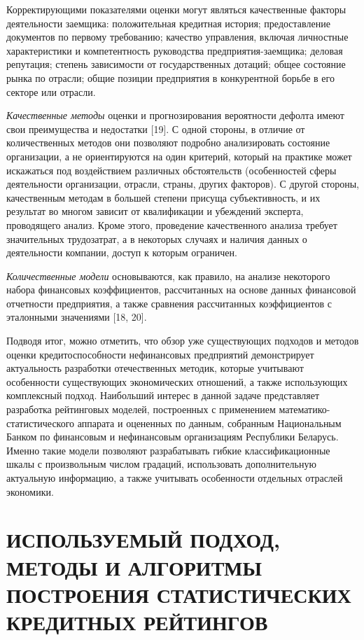 \documentclass[14pt,a4paper]{extarticle}
\begin{document}
Корректирующими показателями оценки могут являться качественные факторы деятельности заемщика: 
положительная кредитная история; предоставление документов по первому требованию; качество управления, 
включая личностные характеристики и компетентность руководства предприятия-заемщика; деловая репутация; 
степень зависимости от государственных дотаций; общее состояние рынка по отрасли; общие позиции 
предприятия в конкурентной борьбе в его секторе или отрасли.

\textit{Качественные методы} оценки и прогнозирования вероятности дефолта имеют свои преимущества и 
недостатки [19]. С одной стороны, в отличие от количественных методов они позволяют подробно 
анализировать состояние организации, а не ориентируются на один критерий, который на практике может 
искажаться под воздействием различных обстоятельств (особенностей сферы деятельности организации, отрасли, 
страны, других факторов). С другой стороны, качественным методам в большей степени присуща субъективность, 
и их результат во многом зависит от квалификации и убеждений эксперта, проводящего анализ. Кроме этого, 
проведение качественного анализа требует значительных трудозатрат, а в некоторых случаях и наличия данных 
о деятельности компании, доступ к которым ограничен.

\textit{Количественные модели} основываются, как правило, на анализе некоторого набора финансовых 
коэффициентов, рассчитанных на основе данных финансовой отчетности предприятия, а также сравнения 
рассчитанных коэффициентов с эталонными значениями [18, 20].

Подводя итог, можно отметить, что обзор уже существующих подходов и методов оценки кредитоспособности 
нефинансовых предприятий демонстрирует актуальность разработки отечественных методик, которые учитывают 
особенности существующих экономических отношений, а также использующих комплексный подход. Наибольший 
интерес в данной задаче представляет разработка рейтинговых моделей, построенных с применением 
математико-статистического аппарата и оцененных по данным, собранным Национальным Банком по финансовым 
и нефинансовым организациям Республики Беларусь. Именно такие модели позволяют разрабатывать гибкие 
классификационные шкалы с произвольным числом градаций, использовать дополнительную актуальную информацию, 
а также учитывать особенности отдельных отраслей экономики.

\clearpage

\section{ИСПОЛЬЗУЕМЫЙ ПОДХОД, МЕТОДЫ И АЛГОРИТМЫ ПОСТРОЕНИЯ СТАТИСТИЧЕСКИХ КРЕДИТНЫХ РЕЙТИНГОВ}
\end{document}
